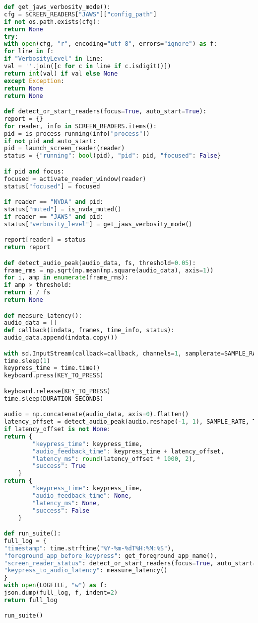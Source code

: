 \begin{lstlisting}[language=python]
def get_jaws_verbosity_mode():
cfg = SCREEN_READERS["JAWS"]["config_path"]
if not os.path.exists(cfg):
return None
try:
with open(cfg, "r", encoding="utf-8", errors="ignore") as f:
for line in f:
if "VerbosityLevel" in line:
val = ''.join([c for c in line if c.isdigit()])
return int(val) if val else None
except Exception:
return None
return None

def detect_or_start_readers(focus=True, auto_start=True):
report = {}
for reader, info in SCREEN_READERS.items():
pid = is_process_running(info["process"])
if not pid and auto_start:
pid = launch_screen_reader(reader)
status = {"running": bool(pid), "pid": pid, "focused": False}

if pid and focus:
focused = activate_reader_window(reader)
status["focused"] = focused

if reader == "NVDA" and pid:
status["muted"] = is_nvda_muted()
if reader == "JAWS" and pid:
status["verbosity_level"] = get_jaws_verbosity_mode()

report[reader] = status
return report

def detect_audio_peak(audio_data, fs, threshold=0.05):
frame_rms = np.sqrt(np.mean(np.square(audio_data), axis=1))
for i, amp in enumerate(frame_rms):
if amp > threshold:
return i / fs
return None

def measure_latency():
audio_data = []
def callback(indata, frames, time_info, status):
audio_data.append(indata.copy())

with sd.InputStream(callback=callback, channels=1, samplerate=SAMPLE_RATE):
time.sleep(1)
keypress_time = time.time()
keyboard.press(KEY_TO_PRESS)

keyboard.release(KEY_TO_PRESS)
time.sleep(DURATION_SECONDS)

audio = np.concatenate(audio_data, axis=0).flatten()
latency_offset = detect_audio_peak(audio.reshape(-1, 1), SAMPLE_RATE, THRESHOLD)
if latency_offset is not None:
return {
		"keypress_time": keypress_time,
		"audio_feedback_time": keypress_time + latency_offset,
		"latency_ms": round(latency_offset * 1000, 2),
		"success": True
	}
return {
		"keypress_time": keypress_time,
		"audio_feedback_time": None,
		"latency_ms": None,
		"success": False
	}

def run_suite():
full_log = {
"timestamp": time.strftime("%Y-%m-%dT%H:%M:%S"),
"foreground_app_before_keypress": get_foreground_app_name(),
"screen_reader_status": detect_or_start_readers(focus=True, auto_start=True),
"keypress_to_audio_latency": measure_latency()
}
with open(LOGFILE, "w") as f:
json.dump(full_log, f, indent=2)
return full_log

run_suite()
\end{lstlisting}

